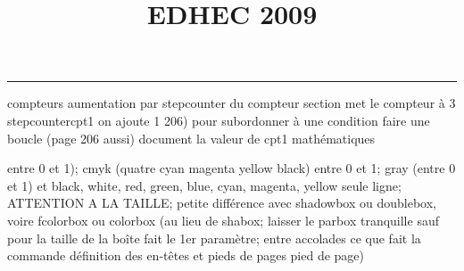 \documentclass[11pt]{article}%
\title{\bf \vspace{-2cm} EDHEC 2009} %
\author{} %
\date{} %
\renewcommand{\headrulewidth}{0pt}%
\renewcommand{\footrulewidth}{0.4pt}%
\begin{document}
\maketitle %
\vspace{-1.4cm}\hrule %
\thispagestyle{fancy}

\vspace*{.2cm}



compteurs%
aumentation par stepcounter du compteur section%
met le compteur à 3%
stepcounter{cpt1} on ajoute 1%
206) pour subordonner à une condition %
faire une boucle (page 206 aussi) %
document la valeur de cpt1 
mathématiques\newcommand{\ch}{\operatorname{ch}} 
\newcommand{\sh}{\operatorname{sh}}
\renewcommand{\tanh}{\operatorname{th}}
\renewcommand{\sinh}{\operatorname{sh}}
\renewcommand{\cosh}{\operatorname{ch}}
\newcommand{\argsh}{\operatorname{argsh}}
\newcommand{\argch}{\operatorname{argch}}
\newcommand{\argth}{\operatorname{argth}}
\newcommand{\ker}{\operatorname{Ker}}
\renewcommand{\im}{\operatorname{Im}}
\newcommand{\rg}{\operatorname{rg}}
\newcommand{\Id}{\operatorname{Id}}
\newcommand{\id}{\operatorname{id}}
\renewcommand{\leq}{\leq}
\renewcommand{\geq}{\geq }

entre 0 et 1); cmyk (quatre cyan magenta yellow black) entre 0 et 1;
gray (entre 0 et 1) et black, white, red, green, blue, cyan, magenta,
yellow%
seule ligne; ATTENTION A LA TAILLE; petite différence avec shadowbox ou
doublebox, voire fcolorbox ou colorbox (au lieu de shabox; laisser le
parbox tranquille sauf pour la taille de la boîte
\newcommand{\Tbox}[1]{\begin{center} \shabox{\parbox{0.6
\linewidth}{#1}} \end{center}} %
fait le 1er paramètre; entre accolades ce que fait la commande
définition des en-têtes et pieds de pages\pagestyle{fancy}
\chead{}
\rfoot[ \ \thepage]{\thepage}
\cfoot{}
\lfoot{}
\thispagestyle{fancy} %
pied de page)\renewcommand{\footrulewidth}{0.4pt}
\renewcommand{\headrulewidth}{0.4pt}
\end{document}
